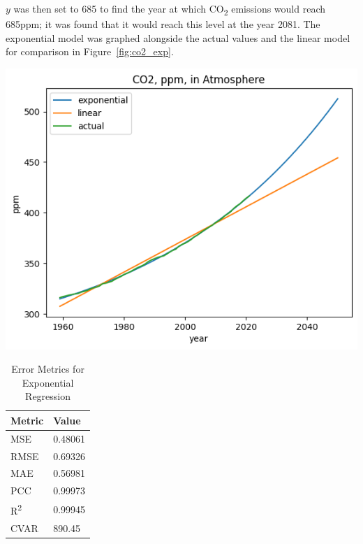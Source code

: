 \documentclass{mcmthesis}
\begin{document}
    $y$ was then set to 685 to find the year at which CO\textsubscript{2} emissions would reach 685ppm; it was found that it would reach this level at the year 2081.
    The exponential model was graphed alongside the actual values and the linear model for comparison in Figure~\ref{fig:co2_exp}.

    \begin{table}[h]
        \begin{minipage}{0.7\linewidth}
            \centering
            \includegraphics[width=\textwidth]{exponential}%
            \label{fig:co2_exp}
        \end{minipage}%
        \begin{minipage}{0.3\linewidth}
            \centering
            \begin{tabular}{ll}
                \toprule
                Metric               & Value   \\
                \midrule
                MSE                  & 0.48061 \\
                RMSE                 & 0.69326 \\
                MAE                  & 0.56981 \\
                PCC                  & 0.99973 \\
                R\textsuperscript{2} & 0.99945 \\
                CVAR                 & 890.45  \\
                \bottomrule
            \end{tabular}
            \caption{Error Metrics for Exponential Regression}
            \label{tab:co2_exp_err}
        \end{minipage}
    \end{table}
\end{document}
